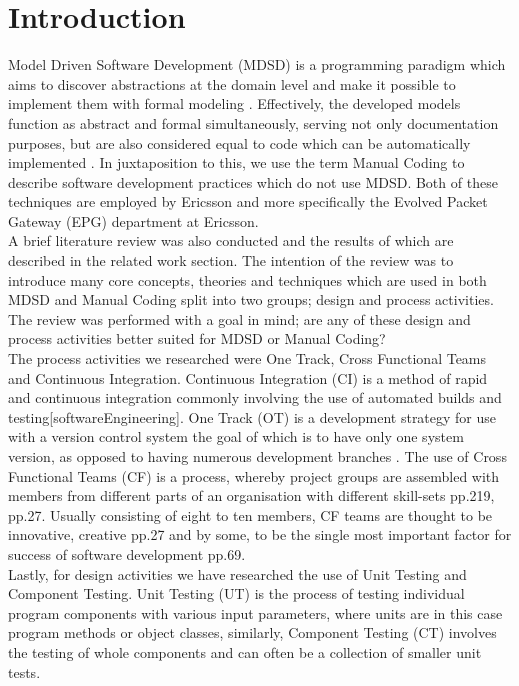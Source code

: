 \documentclass[fina_report_innit.tex]{subfiles}
\begin{document}
\section{Introduction}

Model Driven Software Development (MDSD) is a programming paradigm which aims to discover abstractions at the domain level and make it possible to implement them with formal modeling \cite{stahl2006model}. Effectively, the developed models function as abstract and formal simultaneously, serving not only documentation purposes, but are also considered equal to code which can be automatically implemented \cite{stahl2006model}. In juxtaposition to this, we use the term Manual Coding to describe software development practices which do not use MDSD. Both of these techniques are employed by Ericsson and more specifically the Evolved Packet Gateway (EPG) department at Ericsson.
\\

A brief literature review was also conducted and the results of which are described in the related work section. The intention of the review was to introduce many core concepts, theories and techniques which are used in both MDSD and Manual Coding split into two groups; design and process activities. The review was performed with a goal in mind; are any of these design and process activities better suited for MDSD or Manual Coding?
\\

The process activities we researched were One Track, Cross Functional Teams and Continuous Integration. Continuous Integration (CI) is a method of rapid and continuous integration commonly involving the use of automated builds and testing[softwareEngineering]. One Track (OT) is a development strategy for use with a version control system the goal of which is to have only one system version, as opposed to having numerous development branches \cite{hribar2008first}. The use of Cross Functional Teams (CF) is a process, whereby project groups are assembled with members from different parts of an organisation with different skill-sets \cite{henke1993perspective} pp.219, \cite{ghobadi2011challenges} pp.27. Usually consisting of eight to ten members, CF teams are thought to be innovative, creative \cite{ghobadi2011challenges} pp.27 and by some, to be the single most important factor for success of software development \cite{marchwinski2000technical} pp.69.
\\

Lastly, for design activities we have researched the use of Unit Testing and Component Testing. Unit Testing (UT) is the process of testing individual program components with various input parameters, where units are in this case program methods or object classes, similarly, Component Testing (CT) involves the testing of whole components and can often be a collection of smaller unit tests.
\end{document}
